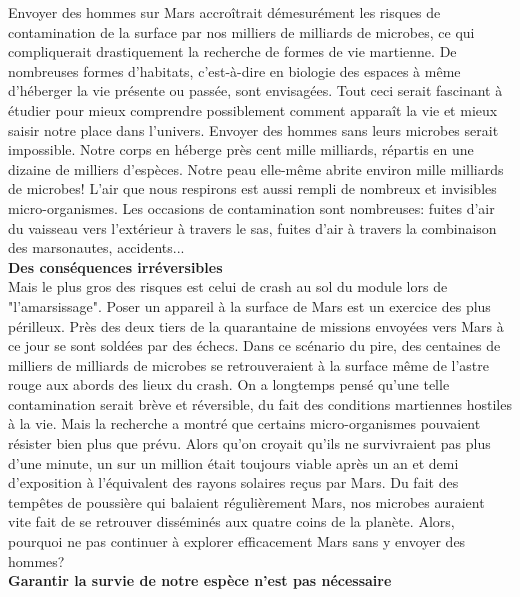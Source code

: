 \documentclass[8pt]{article}
\begin{document}
Envoyer des hommes sur Mars accroîtrait démesurément les risques de contamination de la surface par nos milliers de milliards de microbes, ce qui compliquerait drastiquement la recherche de formes de vie martienne. De nombreuses formes d'habitats, c'est-à-dire en biologie des espaces à même d'héberger la vie présente ou passée, sont envisagées. Tout ceci serait fascinant à étudier pour mieux comprendre possiblement comment apparaît la vie et mieux saisir notre place dans l'univers. 
Envoyer des hommes sans leurs microbes serait impossible. Notre corps en héberge près cent mille milliards, répartis en une dizaine de milliers d'espèces. Notre peau elle-même abrite environ mille milliards de microbes! L'air que nous respirons est aussi rempli de nombreux et invisibles micro-organismes. Les occasions de contamination sont nombreuses: fuites d'air du vaisseau vers l'extérieur à travers le sas, fuites d'air à travers la combinaison des marsonautes, accidents...  \\

\textbf{Des conséquences irréversibles}\\

Mais le plus gros des risques est celui de crash au sol du module lors de "l'amarsissage". Poser un appareil à la surface de Mars est un exercice des plus périlleux. Près des deux tiers de la quarantaine de missions envoyées vers Mars à ce jour se sont soldées par des échecs. Dans ce scénario du pire, des centaines de milliers de milliards de microbes se retrouveraient à la surface même de l'astre rouge aux abords des lieux du crash.  
On a longtemps pensé qu'une telle contamination serait brève et réversible, du fait des conditions martiennes hostiles à la vie. Mais la recherche a montré que certains micro-organismes pouvaient résister bien plus que prévu. Alors qu'on croyait qu'ils ne survivraient pas plus d'une minute, un sur un million était toujours viable après un an et demi d'exposition à l'équivalent des rayons solaires reçus par Mars. Du fait des tempêtes de poussière qui balaient régulièrement Mars, nos microbes auraient vite fait de se retrouver disséminés aux quatre coins de la planète. Alors, pourquoi ne pas continuer à explorer efficacement Mars sans y envoyer des hommes? \\

\newpage
\textbf{Garantir la survie de notre espèce n'est pas nécessaire}\\
\end{document}
